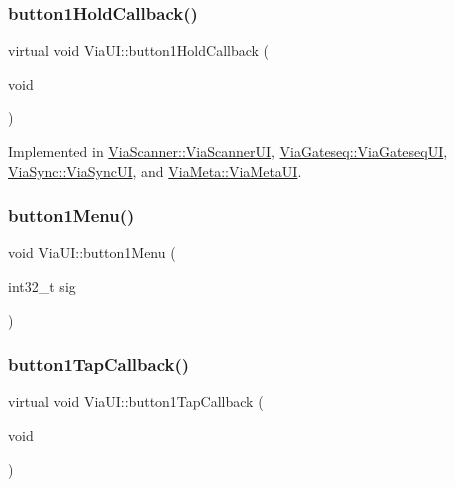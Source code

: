 \mbox{\label{class_via_u_i_a62145ce1c1b664ff0a1aadaac9386162}} 
\subsubsection{\texorpdfstring{button1\+Hold\+Callback()}{button1HoldCallback()}}
{\footnotesize\ttfamily virtual void Via\+U\+I\+::button1\+Hold\+Callback (\begin{DoxyParamCaption}\item[{void}]{ }\end{DoxyParamCaption})\hspace{0.3cm}{\ttfamily [pure virtual]}}



Implemented in \mbox{\hyperlink{class_via_scanner_1_1_via_scanner_u_i_a8d7608e430d6be2777f4fb76b4ea9f2b}{Via\+Scanner\+::\+Via\+Scanner\+UI}}, \mbox{\hyperlink{class_via_gateseq_1_1_via_gateseq_u_i_a4123b11e47b7dc36bba9041fa3635e84}{Via\+Gateseq\+::\+Via\+Gateseq\+UI}}, \mbox{\hyperlink{class_via_sync_1_1_via_sync_u_i_acd1a12bdb9cc39045eee719af6d70d1c}{Via\+Sync\+::\+Via\+Sync\+UI}}, and \mbox{\hyperlink{class_via_meta_1_1_via_meta_u_i_a601890a2c65f53fc575c9ef211fcfeaa}{Via\+Meta\+::\+Via\+Meta\+UI}}.

\mbox{\label{class_via_u_i_ae921a22294017c3a1aa3e670d30768a1}} 
\subsubsection{\texorpdfstring{button1\+Menu()}{button1Menu()}}
{\footnotesize\ttfamily void Via\+U\+I\+::button1\+Menu (\begin{DoxyParamCaption}\item[{int32\+\_\+t}]{sig }\end{DoxyParamCaption})}

\mbox{\label{class_via_u_i_a5bdacaef84e33fb3d9b3dd50d1b269d1}} 
\subsubsection{\texorpdfstring{button1\+Tap\+Callback()}{button1TapCallback()}}
{\footnotesize\ttfamily virtual void Via\+U\+I\+::button1\+Tap\+Callback (\begin{DoxyParamCaption}\item[{void}]{ }\end{DoxyParamCaption})\hspace{0.3cm}{\ttfamily [pure virtual]}}



